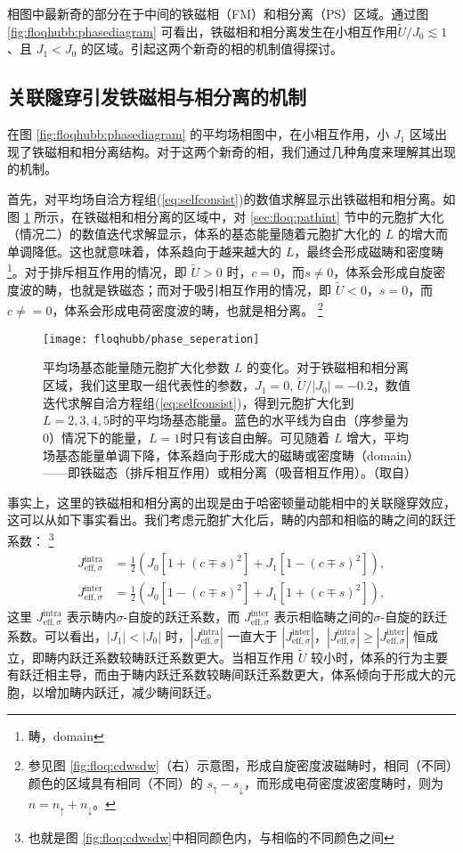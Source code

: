相图中最新奇的部分在于中间的铁磁相（FM）和相分离（PS）区域。通过图 \ref{fig:floqhubb:phasediagram} 可看出，铁磁相和相分离发生在小相互作用$\tilde{U}/J_0\lesssim1$、且 $J_1<J_0$ 的区域。引起这两个新奇的相的机制值得探讨。


\subsection{关联隧穿引发铁磁相与相分离的机制}
在图 \ref{fig:floqhubb:phasediagram} 的平均场相图中，在小相互作用，小 $J_1$ 区域出现了铁磁相和相分离结构。对于这两个新奇的相，我们通过几种角度来理解其出现的机制。

首先，对平均场自洽方程组(\ref{eq:selfconsist})的数值求解显示出铁磁相和相分离。如图 \ref{fig:floqhubb:seperation} 所示，在铁磁相和相分离的区域中，对 \ref{sec:floq:pathint} 节中的元胞扩大化（情况二）的数值迭代求解显示，体系的基态能量随着元胞扩大化的 $L$ 的增大而单调降低。这也就意味着，体系趋向于越来越大的 $L$，最终会形成磁畴和密度畴\footnote{畴，domain}。对于排斥相互作用的情况，即 $\tilde{U}>0$ 时，$c=0$，而$s\neq0$，体系会形成自旋密度波的畴，也就是铁磁态；而对于吸引相互作用的情况，即 $\tilde{U}<0$，$s=0$，而 $c\neq=0$，体系会形成电荷密度波的畴，也就是相分离。
\footnote{参见图 \ref{fig:floq:cdwsdw}（右）示意图，形成自旋密度波磁畴时，相同（不同）颜色的区域具有相同（不同）的 $s_{\uparrow}-s_{\downarrow}$，而形成电荷密度波密度畴时，则为 $n=n_{\uparrow}+n_{\downarrow}$。}

\begin{figure}[!htb]
\centering
\texttt{[image: floqhubb/phase\_seperation]}
\caption{平均场基态能量随元胞扩大化参数 $L$ 的变化。对于铁磁相和相分离区域，我们这里取一组代表性的参数，$J_1=0$, $\tilde{U}/|J_0|=-0.2$，数值迭代求解自洽方程组(\ref{eq:selfconsist})，得到元胞扩大化到$L=2,3,4,5$时的平均场基态能量。蓝色的水平线为自由（序参量为0）情况下的能量，$L=1$时只有该自由解。可见随着 $L$ 增大，平均场基态能量单调下降，体系趋向于形成大的磁畴或密度畴（domain）——即铁磁态（排斥相互作用）或相分离（吸音相互作用）。（取自）}
\label{fig:floqhubb:seperation}
\end{figure}

事实上，这里的铁磁相和相分离的出现是由于哈密顿量动能相中的关联隧穿效应，这可以从如下事实看出。我们考虑元胞扩大化后，畴的内部和相临的畴之间的跃迁系数：
\footnote{也就是图 \ref{fig:floq:cdwsdw}中相同颜色内，与相临的不同颜色之间}
\begin{align}
    J^{\text{intra}}_{\text{eff},\sigma} &= \frac{1}{2} \left(J_0[1+(c\mp s)^2]+J_1[1-(c\mp s)^2]\right), \\
    J^{\text{inter}}_{\text{eff},\sigma} &= \frac{1}{2} \left(J_0[1-(c\mp s)^2]+J_1[1+(c\mp s)^2]\right),
\end{align}
这里 $J^{\text{intra}}_{\text{eff},\sigma}$ 表示畴内$\sigma$-自旋的跃迁系数，而 $J^{\text{inter}}_{\text{eff},\sigma}$ 表示相临畴之间的$\sigma$-自旋的跃迁系数。可以看出，$|J_1|<|J_0|$ 时，$|J^{\text{intra}}_{\text{eff},\sigma}|$ 一直大于 $|J^{\text{inter}}_{\text{eff},\sigma}|$，$|J^{\text{intra}}_{\text{eff},\sigma}|\geq|J^{\text{inter}}_{\text{eff},\sigma}|$ 恒成立，即畴内跃迁系数较畴跃迁系数更大。当相互作用 $\tilde{U}$ 较小时，体系的行为主要有跃迁相主导，而由于畴内跃迁系数较畴间跃迁系数更大，体系倾向于形成大的元胞，以增加畴内跃迁，减少畴间跃迁。


